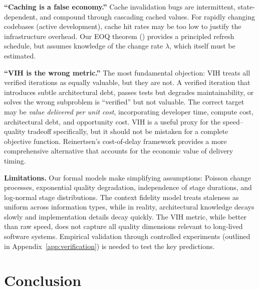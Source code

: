 \documentclass[11pt, a4paper, copyright]{googledeepmind}
\begin{document}
\textbf{``Caching is a false economy.''} Cache invalidation bugs are intermittent, state-dependent, and compound through cascading cached values. For rapidly changing codebases (active development), cache hit rates may be too low to justify the infrastructure overhead. Our EOQ theorem () provides a principled refresh schedule, but assumes knowledge of the change rate $\lambda$, which itself must be estimated.

\textbf{``VIH is the wrong metric.''} The most fundamental objection: VIH treats all verified iterations as equally valuable, but they are not. A verified iteration that introduces subtle architectural debt, passes tests but degrades maintainability, or solves the wrong subproblem is ``verified'' but not valuable. The correct target may be \emph{value delivered per unit cost}, incorporating developer time, compute cost, architectural debt, and opportunity cost. VIH is a useful proxy for the speed--quality tradeoff specifically, but it should not be mistaken for a complete objective function. Reinertsen's cost-of-delay framework provides a more comprehensive alternative that accounts for the economic value of delivery timing.

\textbf{Limitations.} Our formal models make simplifying assumptions: Poisson change processes, exponential quality degradation, independence of stage durations, and log-normal stage distributions. The context fidelity model treats staleness as uniform across information types, while in reality, architectural knowledge decays slowly and implementation details decay quickly. The VIH metric, while better than raw speed, does not capture all quality dimensions relevant to long-lived software systems. Empirical validation through controlled experiments (outlined in Appendix~\ref{app:verification}) is needed to test the key predictions.


\section{Conclusion}\label{sec:conclusion}
\end{document}

